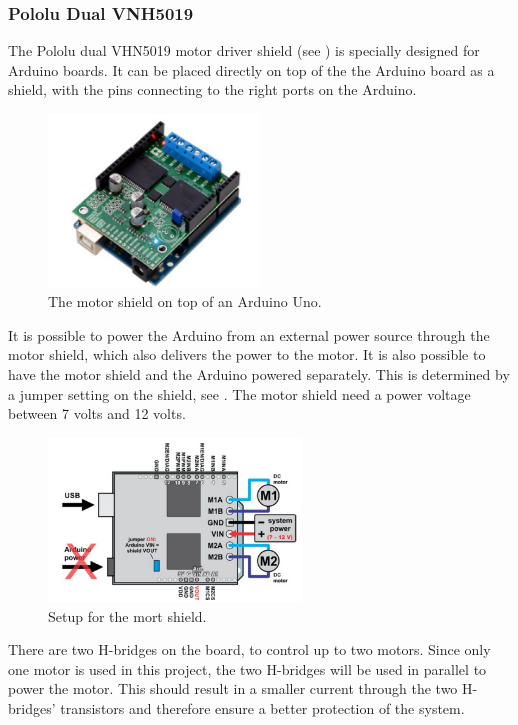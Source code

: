 \subsubsection{Pololu Dual VNH5019}
The Pololu dual VHN5019 motor driver shield (see ) is specially designed for Arduino boards. It can be placed directly on top of the the Arduino board as a shield, with the pins connecting to the right ports on the Arduino. 

\begin{figure}[H]
	\centering
	\includegraphics[width=0.50\textwidth]{figures/Motordriver.png}
		\caption{The motor shield on top of an Arduino Uno.} 
	\label{MotorDrive}
\end{figure}

It is possible to power the Arduino from an external power source through the motor shield, which also delivers the power to the motor. It is also possible to have the motor shield and the Arduino powered separately. This is determined by a jumper setting on the shield, see . The motor shield need a power voltage between 7 volts and 12 volts.

\begin{figure}[H]
	\centering
	\includegraphics[width=0.60\textwidth]{figures/MotordriverIO.png}
		\caption{Setup for the mort shield.}
	\label{MotorDriveIO}
\end{figure}

There are two H-bridges on the board, to control up to two motors. Since only one motor is used in this project, the two H-bridges will be used in parallel to power the motor. This should result in a smaller current through the two H-bridges' transistors and therefore ensure a better protection of the system.

